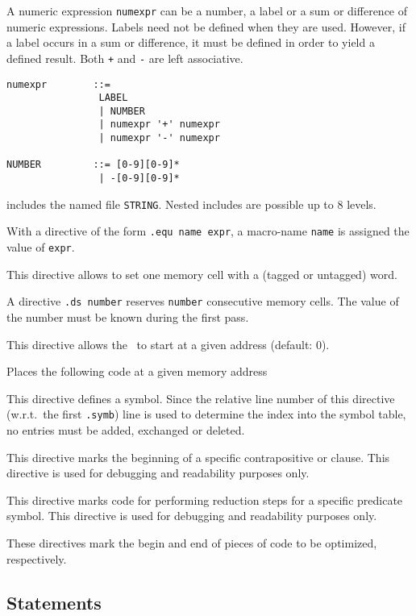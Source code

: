 A numeric expression {\tt numexpr} can be a number, a label or a
sum or difference of numeric expressions. Labels need not be defined
when they are used. However, if a label occurs in a sum or difference,
it must be defined in order to yield a defined result.
Both {\tt +} and {\tt -} are left associative.

\begin{verbatim}
numexpr        ::=
                LABEL
                | NUMBER
                | numexpr '+' numexpr
                | numexpr '-' numexpr

NUMBER         ::= [0-9][0-9]*
                | -[0-9][0-9]*
\end{verbatim}

includes the named file {\tt STRING}. Nested includes are possible up
to 8 levels.

With a directive of the form {\tt .equ name expr}, a macro-name {\tt name}
is assigned the value of {\tt expr}.

This directive allows to set one memory cell with a (tagged or untagged)
word.

A directive {\tt .ds number} reserves {\tt number} consecutive
memory cells. The value of the number must be known during the
first pass.

This directive allows the \SAM\ to start at a given address
(default: 0).

Places the following code at a given memory address

This directive defines a symbol. Since the relative line number of
this directive (w.r.t.\ the first {\tt .symb}) line is used to determine
the index into the symbol table, no entries must be added, exchanged or
deleted.

This directive marks the beginning of a specific contrapositive or clause.
This directive is used for debugging and readability purposes only.

This directive marks code for performing reduction steps for a
specific predicate symbol.
This directive is used for debugging and readability purposes only.

These directives mark the begin and end of pieces of code to be optimized,
respectively.

\subsection{Statements}

